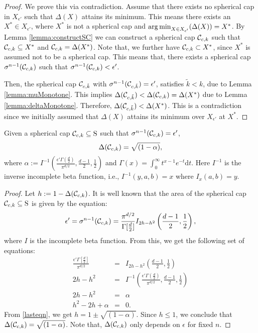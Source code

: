 \begin{proof}We prove this via contradiction. Assume that there exists no spherical cap in $X_{\epsilon'}$ such that $\Delta(X)$ attains its minimum. This means there exists an $X^* \in X_{\epsilon'}$, where $X^*$ is not a spherical cap and $\operatorname*{arg\,min}_{X \in X_{\epsilon'}}(\Delta(X))=X^*$. By Lemma \ref{lemma:constructSC} we can construct a spherical cap $\mathcal{C}_{c,k}$ such that $\mathcal{C}_{c,k} \subseteq X^*$ and $\mathcal{C}_{c,k} = \Delta(X^*)$. Note that, we further have $\mathcal{C}_{c,k} \subset X^*$, since $X^*$ is assumed not to be a spherical cap. This means that, there exists a spherical cap $\sigma^{n-1}(\mathcal{C}_{c,k})$ such that $\sigma^{n-1}(\mathcal{C}_{c,k}) < \epsilon'$. 

Then, the spherical cap $\mathcal{C}_{c, \tilde{k}}$ with $\sigma^{n-1}(\mathcal{C}_{c, \tilde{k}}) = \epsilon'$, satisfies $\tilde{k} < k$, due to Lemma \ref{lemma:muMonotone}. This implies $\Delta(\mathcal{C}_{c, \tilde{k}}) < \Delta(\mathcal{C}_{c, k}) = \Delta(X^*)$ due to Lemma \ref{lemma:deltaMonotone}. Therefore, $\Delta(\mathcal{C}_{c, \tilde{k}}) < \Delta(X^*)$. This is a contradiction since we initially assumed that $\Delta(X)$ attains its minimum over $X_{\epsilon'}$ at $X^*$.
\end{proof}

\begin{theorem}Given a spherical cap $\mathcal{C}_{c,k} \subseteq \text{S}$ such that $\sigma^{n-1}(\mathcal{C}_{c,k}) = \epsilon'$, 
\begin{equation*}\Delta(\mathcal{C}_{c,k}) = \sqrt{(1-\alpha)}, \end{equation*}
where $\alpha := I^{-1}\left(\frac{\epsilon'\Gamma(\frac{d}{2})}{\pi^{d/2}}, \frac{d-1}{2}, \frac{1}{2}\right)$ and $\Gamma(x)=\int_{0}^{\infty} t^{x-1} e^{-t} \text{d}t$. Here $I^{-1}$ is the inverse incomplete beta function, i.e.,  $I^{-1}(y, a,b)= x$ where $I_x(a,b)=y$.
\end{theorem}

\begin{proof}Let $h:=1-\Delta(\mathcal{C}_{c,k})$. It is well known \cite{sphericalCapRef} that the area of the spherical cap $\mathcal{C}_{c,k} \subseteq \text{S}$ is given by the equation:
\begin{equation}\epsilon' = \sigma^{n-1}(\mathcal{C}_{c,k}) = \frac{\pi^{d/2}}{\Gamma[\frac{d}{2}]}I_{2h-h^2} \left(\frac{d-1}{2}, \frac{1}{2}\right),
\end{equation}
where $I$ is the incomplete beta function. 
From this, we get the following set of equations:
\begin{eqnarray}\nonumber \frac{\epsilon' \Gamma[\frac{d}{2}]}{\pi^{d/2}} &=& I_{2h-h^2}\left(\frac{d-1}{2}, \frac{1}{2}\right) \\
\nonumber 2h-h^2 &=&  I^{-1}\left(\frac{\epsilon'\Gamma(\frac{d}{2})}{\pi^{d/2}}, \frac{d-1}{2}, \frac{1}{2}\right) \\
\nonumber 2h-h^2 & = & \alpha \\
\label{lasteqn}h^2 -2h +\alpha &=& 0.
\end{eqnarray}
From \eqref{lasteqn}, we get $h=1\pm \sqrt{(1-\alpha)}$. Since $h\leq1$, we conclude that \mbox{$\Delta(\mathcal{C}_{c,k}) = \sqrt{(1-\alpha)}$.} Note that, $\Delta(\mathcal{C}_{c,k})$ only depends on $\epsilon$ for fixed $n$.
\end{proof}

